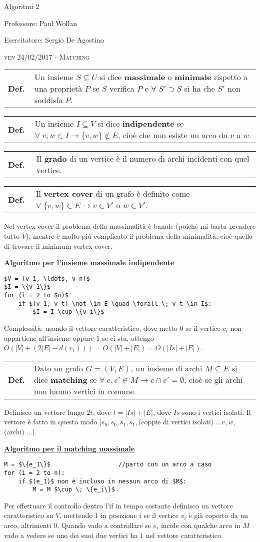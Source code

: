 \documentclass[a4paper,10pt]{article} %
\newcommand{\malgorithm}[1]{%
    {\bigbreak \par \hspace*{4pt} \underline{\textbf {#1}}}}
\newcommand{\msection}[1]{%
    {\newpage\bigbreak \bigbreak \par \hfil \huge \textsc {#1}}\par}
\renewcommand{\b}[1]{%
    {\textbf{#1}}}
\newcommand{\mdef}[1]{%
    {\smallbreak\par\begin{tabular}{ll} \textbf{Def.$\;\;$} & \begin{minipage}[t]{0.80\columnwidth}\normalsize  {#1}\end{minipage}\tabularnewline \end{tabular}}\smallskip\par}
\begin{document}
\msection{}

\vspace{20em}
{\Huge \hfil Algoritmi 2 \par}
\vspace{1em}
{\hfil Professore: Paul Wollan}
\par
\vspace{1em}
{\hfil Esercitatore: Sergio De Agostino}


\msection{ven 24/02/2017 - Matching}



\mdef{Un insieme $S \subseteq U$ si dice \b{massimale} o \b{minimale} rispetto a una proprietà $P$ se $S$ verifica $P$ e $\forall \; S' \supset S$ si ha che $S'$ non soddisfa $P$.}
\mdef{Un insieme $I \subseteq V$ si dice \b{indipendente} se $\forall \; v, w \in I \rightarrow \{v, w\} \not \in E$, cioè che non esiste un arco da $v$ a $w$.}
\mdef{Il \b{grado} di un vertice è il numero di archi incidenti con quel vertice.}
\mdef{Il \b{vertex cover} di un grafo è definito come $\forall \; \{v, w\} \in E \rightarrow v \in V' $ o $w \in V'$.}

Nel vertex cover il problema della massimalità è banale (poichè mi basta prendere tutto $V$), mentre è molto più complicato il problema della minimalità, cioè quello di trovare il minimum vertex cover.

\malgorithm{Algoritmo per l'insieme massimale indipendente}
\begin{lstlisting}
$V = (v_1, \ldots, v_n)$
$I = \{v_1\}$
for (i = 2 to $n)$
    if $(v_1, v_t) \not \in E \quad \forall \; v_t \in I$:
        $I = I \cup \{v_i\}$
\end{lstlisting}

Complessità: usando il vettore caratteristico, dove metto $0$ se il vertice $v_i$ non appartiene all'insieme oppure $1$ se ci sta, ottengo $O(|V| + (2|E| - d(v_1))) = O(|V| + |E|) = O(|Is| + |E|)$.

\mdef{Dato un grafo $G = (V,E)$, un insieme di archi $M \subseteq E$ si dice \b{matching} se $\forall \; e, e' \in M \rightarrow e \cap e' = \emptyset$, cioè se gli archi non hanno vertici in comune.}

Definisco un vettore lungo $2t$, dove $t = |Is| + |E|$, dove $Is$ sono i vertici isolati. Il vettore è fatto in questo modo $[s_0, s_0, s_1, s_1, $(coppie di vertici isolati) $\ldots v, w, $(archi) $\ldots]$.

\malgorithm{Algoritmo per il matching massimale}
\begin{lstlisting}
M = $\{e_1\}$                   //parto con un arco a caso
for (i = 2 to n):
    if $(e_1)$ non è incluso in nessun arco di $M$:
        M = M $\cup \; \{e_i\}$
\end{lstlisting}
Per effettuare il controllo dentro l'if in tempo costante definisco un vettore caratteristico su $V$, mettendo $1$ in posizione $i$ se il vertice $v_i$ è già coperto da un arco, altrimenti $0$. Quando vado a controllare se $e_i$ incide con qualche arco in $M$ vado a vedere se uno dei suoi due vertici ha $1$ nel vettore caratteristico. 
\end{document}
